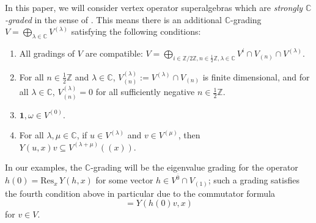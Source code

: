 \documentclass[11pt, reqno]{amsart}
\theoremstyle{definition}\newtheorem{defi}[thm]{Definition}
\theoremstyle{definition}\newtheorem{rem}[thm]{Remark}
\theoremstyle{definition}\newtheorem{exam}[thm]{Example}
\theoremstyle{definition}\newtheorem{assum}[thm]{Assumption}
\newcommand{\CC}{\mathbb{C}}
\newcommand{\ZZ}{\mathbb{Z}}
\newcommand{\vac}{\mathbf{1}}
\newcommand{\even}{\overline{0}}
\begin{document}
In this paper, we will consider vertex operator superalgebras which are \textit{strongly $\CC$-graded} in the sense of \cite[Definition 2.23]{HLZ1}. This means there is an additional $\CC$-grading $V=\bigoplus_{\lambda\in\CC} V^{(\lambda)}$ satisfying the following conditions:
\begin{enumerate}
\item All gradings of $V$ are compatible: $V=\bigoplus_{i\in\ZZ/2\ZZ, n\in\frac{1}{2}\ZZ,\lambda\in\CC} V^i\cap V_{(n)}\cap V^{(\lambda)}$.

\item For all $n\in\frac{1}{2}\ZZ$ and $\lambda\in\CC$, $V^{(\lambda)}_{(n)}:=V^{(\lambda)}\cap V_{(n)}$ is finite dimensional, and for all $\lambda\in\CC$, $V^{(\lambda)}_{(n)}=0$ for all sufficiently negative $n\in\frac{1}{2}\ZZ$.

\item $\vac,\omega\in V^{(0)}$.

\item For all $\lambda,\mu\in\CC$, if $u\in V^{(\lambda)}$ and $v\in V^{(\mu)}$, then  $Y(u,x)v\subseteq V^{(\lambda+\mu)}((x))$.
\end{enumerate}
In our examples, the $\CC$-grading  will be the eigenvalue grading for the operator $h(0)=\mathrm{Res}_x\,Y(h,x)$ for some vector $h\in V^{\even}\cap V_{(1)}$; such a grading satisfies the fourth condition above in particular due to the commutator formula
\begin{equation*}
[h(0), Y(v,x)] =Y(h(0)v,x)
\end{equation*}
for $v\in V$.
\end{document}
